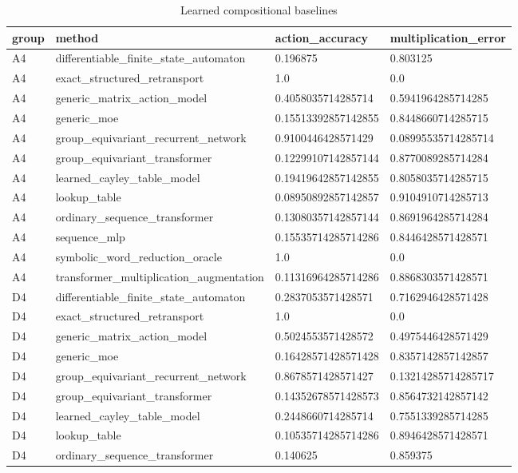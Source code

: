 \begin{table}[t]
\centering
\caption{Learned compositional baselines}
\begin{tabular}{llll}
\toprule
group & method & action\_accuracy & multiplication\_error \\
\midrule
A4 & differentiable\_finite\_state\_automaton & 0.196875 & 0.803125 \\
A4 & exact\_structured\_retransport & 1.0 & 0.0 \\
A4 & generic\_matrix\_action\_model & 0.4058035714285714 & 0.5941964285714285 \\
A4 & generic\_moe & 0.15513392857142855 & 0.8448660714285715 \\
A4 & group\_equivariant\_recurrent\_network & 0.9100446428571429 & 0.08995535714285714 \\
A4 & group\_equivariant\_transformer & 0.12299107142857144 & 0.8770089285714284 \\
A4 & learned\_cayley\_table\_model & 0.19419642857142855 & 0.8058035714285715 \\
A4 & lookup\_table & 0.08950892857142857 & 0.9104910714285713 \\
A4 & ordinary\_sequence\_transformer & 0.13080357142857144 & 0.8691964285714284 \\
A4 & sequence\_mlp & 0.15535714285714286 & 0.8446428571428571 \\
A4 & symbolic\_word\_reduction\_oracle & 1.0 & 0.0 \\
A4 & transformer\_multiplication\_augmentation & 0.11316964285714286 & 0.8868303571428571 \\
D4 & differentiable\_finite\_state\_automaton & 0.2837053571428571 & 0.7162946428571428 \\
D4 & exact\_structured\_retransport & 1.0 & 0.0 \\
D4 & generic\_matrix\_action\_model & 0.5024553571428572 & 0.4975446428571429 \\
D4 & generic\_moe & 0.16428571428571428 & 0.8357142857142857 \\
D4 & group\_equivariant\_recurrent\_network & 0.8678571428571427 & 0.13214285714285717 \\
D4 & group\_equivariant\_transformer & 0.14352678571428573 & 0.8564732142857142 \\
D4 & learned\_cayley\_table\_model & 0.2448660714285714 & 0.7551339285714285 \\
D4 & lookup\_table & 0.10535714285714286 & 0.8946428571428571 \\
D4 & ordinary\_sequence\_transformer & 0.140625 & 0.859375 \\

\end{tabular}
\end{table}
